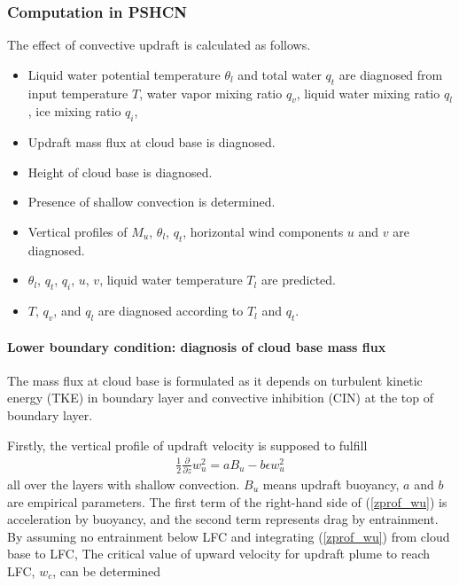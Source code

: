 \hypertarget{computation-in-PSHCN}{%
\subsubsection{Computation in PSHCN}\label{computation-in-PSHCN}}

The effect of convective updraft is calculated as follows.

\begin{itemize}
\item
  Liquid water potential temperature \(\theta_l\) and total water \(q_t\) are diagnosed from input temperature \(T\), water vapor mixing ratio \(q_v\), liquid water mixing ratio \(q_l\), ice mixing
  ratio \(q_i\),
\item
  Updraft mass flux at cloud base is diagnosed.
\item
  Height of cloud base is diagnosed.
\item
  Presence of shallow convection is determined.
\item
  Vertical profiles of \(M_u\), \(\theta_l\), \(q_t\), horizontal wind components \(u\) and \(v\) are diagnosed.
\item
  \(\theta_l\), \(q_t\), \(q_i\), \(u\), \(v\), liquid water temperature \(T_l\) are predicted.
\item
  \(T\), \(q_v\), and \(q_l\) are diagnosed according to \(T_l\) and \(q_t\).
\end{itemize}

\hypertarget{lower-boundary-condition}{%
\paragraph{Lower boundary condition: diagnosis of cloud base mass flux}\label{lower-boundary-condition}}

The mass flux at cloud base is formulated as it depends on turbulent kinetic energy (TKE) in boundary layer and convective inhibition (CIN) at the top of boundary layer.

Firstly, the vertical profile of updraft velocity is supposed to fulfill \begin{eqnarray}\label{zprof_wu}
    \frac{1}{2}\frac{\partial}{\partial z}w_u^2=aB_u-b\epsilon w_u^2\end{eqnarray} all over the layers with shallow convection. \(B_u\) means updraft buoyancy, \(a\) and \(b\) are empirical parameters. The first
term of the right-hand side of (\ref{zprof_wu}) is acceleration by buoyancy, and the second term represents drag by entrainment. By assuming no entrainment below LFC and integrating
(\ref{zprof_wu}) from cloud base to LFC, The critical value of upward velocity for updraft plume to reach LFC, \(w_c\), can be determined

